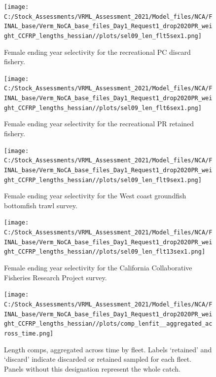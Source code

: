 \documentclass[
  english,
  a4paper,
]{article}
\begin{document}
\begin{figure}
\centering
\texttt{[image: C:/Stock\_Assessments/VRML\_Assessment\_2021/Model\_files/NCA/FINAL\_base/Verm\_NoCA\_base\_files\_Day1\_Request1\_drop2020PR\_weight\_CCFRP\_lengths\_hessian//plots/sel09\_len\_flt5sex1.png]}
\caption{Female ending year selectivity for the recreational PC discard fishery.\label{fig:endyr-selex-REC-PC-DIS}}
\end{figure}

\begin{figure}
\centering
\texttt{[image: C:/Stock\_Assessments/VRML\_Assessment\_2021/Model\_files/NCA/FINAL\_base/Verm\_NoCA\_base\_files\_Day1\_Request1\_drop2020PR\_weight\_CCFRP\_lengths\_hessian//plots/sel09\_len\_flt6sex1.png]}
\caption{Female ending year selectivity for the recreational PR retained fishery.\label{fig:endyr-selex-REC-PR}}
\end{figure}

\begin{figure}
\centering
\texttt{[image: C:/Stock\_Assessments/VRML\_Assessment\_2021/Model\_files/NCA/FINAL\_base/Verm\_NoCA\_base\_files\_Day1\_Request1\_drop2020PR\_weight\_CCFRP\_lengths\_hessian//plots/sel09\_len\_flt9sex1.png]}
\caption{Female ending year selectivity for the West coast groundfish bottomfish trawl survey.\label{fig:endyr-selex-NWFSC-TWL}}
\end{figure}

\begin{figure}
\centering
\texttt{[image: C:/Stock\_Assessments/VRML\_Assessment\_2021/Model\_files/NCA/FINAL\_base/Verm\_NoCA\_base\_files\_Day1\_Request1\_drop2020PR\_weight\_CCFRP\_lengths\_hessian//plots/sel09\_len\_flt13sex1.png]}
\caption{Female ending year selectivity for the California Collaborative Fisheries Research Project survey.\label{fig:endyr-selex-CCFRP}}
\end{figure}

\FloatBarrier

\FloatBarrier

\begin{figure}
\centering
\texttt{[image: C:/Stock\_Assessments/VRML\_Assessment\_2021/Model\_files/NCA/FINAL\_base/Verm\_NoCA\_base\_files\_Day1\_Request1\_drop2020PR\_weight\_CCFRP\_lengths\_hessian//plots/comp\_lenfit\_\_aggregated\_across\_time.png]}
\caption{Length comps, aggregated across time by fleet.
Labels `retained' and `discard' indicate discarded or retained sampled for each fleet. Panels without this designation represent the whole catch.\label{fig:lenfits-all}}
\end{figure}
\end{document}
